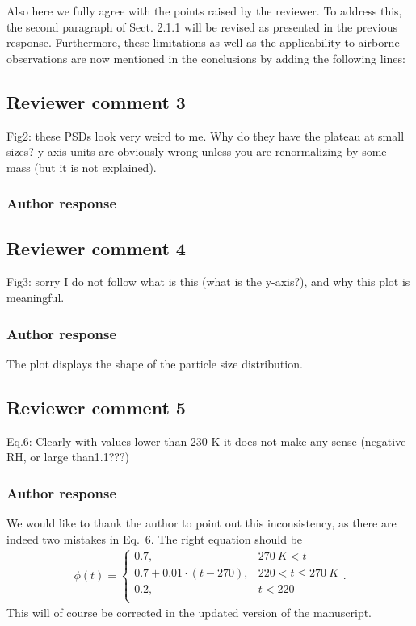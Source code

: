 \documentclass[11pt]{scrartcl}
\begin{document}
Also here we fully agree with the points raised by the reviewer. To address
this, the second paragraph of Sect. 2.1.1 will be revised as presented in the
previous response. Furthermore, these limitations as well as the applicability
to airborne observations are now mentioned in the conclusions by adding the
following lines:






\subsection*{Reviewer comment 3}
Fig2: these PSDs look very weird to me. Why do they have the plateau at small
sizes? y-axis units are obviously wrong unless you are renormalizing by some mass
(but it is not explained).

\subsubsection*{Author response}

\subsection*{Reviewer comment 4}

Fig3: sorry I do not follow what is this (what is the y-axis?), and why this plot is meaningful.

\subsubsection*{Author response}
The plot displays the shape of the particle size distribution.


\subsection*{Reviewer comment 5}
Eq.6: Clearly with values lower than 230 K it does not make any sense (negative RH, or large than1.1???)

\subsubsection*{Author response}

We would like to thank the author to point out this inconsistency, as there are indeed two mistakes
in Eq.~6. The right equation should be
\begin{align}
\phi(t) = \begin{cases}
 0.7, & 270\ \unit{K} < t \\
 0.7 + 0.01 \cdot (t - 270), &220 < t \leq  270\ \unit{K} \\
 0.2,  & t < 220 \\
 \end{cases}.
\end{align}
This will of course be corrected in the updated version of the manuscript.
\end{document}
